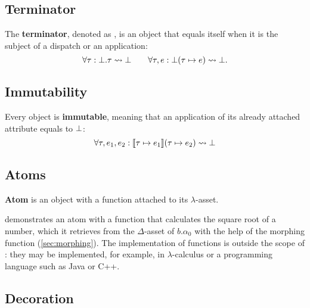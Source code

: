 \subsection{Terminator}\label{sec:terminator}

\begin{definition}[Terminator]
The \textbf{terminator}, denoted as \stx{\dead}, is an object that equals itself when it is
the subject of a dispatch or an application:
\begin{equation*}
\forall \tau : \bot.\tau \mathrel{\leadsto} \bot \qquad \forall \tau, e : \bot( \tau \mapsto e) \mathrel{\leadsto} \bot.
\end{equation*}
\end{definition}

\subsection{Immutability}\label{sec:immutability}

\begin{definition}[Immutability]
Every object is \textbf{immutable}, meaning that an application of
its already attached attribute equals to \(\bot\):
\begin{equation*}
\forall \tau, e_1, e_2 : \llbracket \tau \mapsto e_1 \rrbracket ( \tau \mapsto e_2 ) \mathrel{\leadsto} \bot
\end{equation*}
\end{definition}

\subsection{Atoms}\label{sec:atoms}

\begin{definition}[Atom]
\textbf{Atom} is an object with a function attached to its \(\lambda\)-asset.
\end{definition}

 demonstrates an atom with a function that calculates
the square root of a number, which it retrieves from the \(\Delta\)-asset
of \(b.\alpha_0\) with the help of the morphing function (\cref{sec:morphing}).
The implementation of functions is outside the scope of \phic{}: they may be implemented,
for example, in \(\lambda\)-calculus or a programming language
such as Java or C++.

\subsection{Decoration}\label{sec:decoration}

